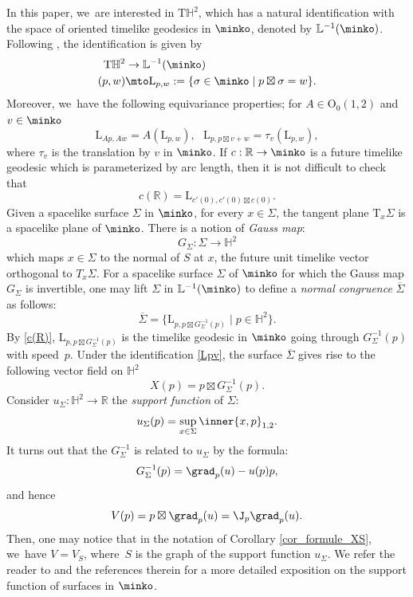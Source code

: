 In this paper, we~are interested in $\mathrm{T}\mathbb{H}^2$, which has a natural identification with the space of oriented timelike geodesics in $\minko$, denoted by $\mathbb{L}^{-1}(\minko)$. Following \cite[\S 6.6]{DGK_complete_lorentz}, the identification is given by
\begin{equation}\label{Lpv}
\begin{aligned}
\mathrm{T}\mathbb{H}^2 & \to \mathbb{L}^{-1}(\minko) \\
(p,w) & \mto \mathrm{L}_{p,w}:=\{\sigma\in\minko \mid p\boxtimes\sigma=w\}.
\end{aligned}
\end{equation}
Moreover, we~have the following equivariance properties; for $A\in \mathrm{O}_0(1,2)$ and $v\in\minko$
\begin{equation}
\mathrm{L}_{Ap,Aw}=A(\mathrm{L}_{p,w}),\ \ \ \mathrm{L}_{p,p\boxtimes v+w}=\tau_v(\mathrm{L}_{p,w}),
\end{equation} where $\tau_v$ is the translation by $v$ in $\minko$.
If $c:\mathbb{R}\to\minko$ is a future timelike geodesic which is parameterized by arc length, then it is not difficult to check that
\begin{equation}\label{c(R)}
c(\mathbb{R})=\mathrm{L}_{c'(0),c'(0)\boxtimes c(0)}.
\end{equation}
Given a spacelike surface $\Sigma$ in $\minko$, \ie for every $x\in\Sigma$, the tangent plane $\mathrm{T}_x\Sigma$ is a spacelike plane of $\minko$. There is a notion of \emph{Gauss map}:
\[
G_{\Sigma}:\Sigma\to\mathbb{H}^2
\]
which maps $x\in\Sigma$ to the normal of $S$ at $x$, \ie the future unit timelike vector orthogonal to $T_x\Sigma$. For a spacelike surface $\Sigma$ of $\minko$ for which the Gauss map $G_{\Sigma}$ is invertible, one may lift $\Sigma$ in $\mathbb{L}^{-1}(\minko)$ to define a \emph{normal congruence} $\overline{\Sigma}$ as follows:
\begin{equation}
\overline{\Sigma}=\{\mathrm{L}_{p,p\boxtimes G^{-1}_{\Sigma}(p)}\mid p\in\mathbb{H}^2\}.
\end{equation}
By \eqref{c(R)}, $\mathrm{L}_{p,p\boxtimes G^{-1}_{\Sigma}(p)}$ is the timelike geodesic in $\minko$ going through $G_{\Sigma}^{-1}(p)$ with speed~$p$.
Under the identification \eqref{Lpv}, the surface $\overline{\Sigma}$ gives rise to the following vector field on $\mathbb{H}^2$
\[
X(p)=p\boxtimes G_{\Sigma}^{-1}(p).
\]
Consider $u_{\Sigma}:\mathbb{H}^2\to\mathbb{R}$ the \emph{support function} of $\Sigma$:
\[
u_{\Sigma}(p)=\sup_{x\in\Sigma}\inner{x,p}_{1,2}.
\]It turns out that the $G_{\Sigma}^{-1}$ is related to $u_{\Sigma}$ by the formula:
\[
G_{\Sigma}^{-1}(p)=\grad_p(u)-u(p)p,
\]
and hence
\[
V(p)=p\boxtimes \grad_p(u)=\J_p\grad_p(u).
\]
Then, one may notice that in the notation of Corollary \ref{cor_formule_XS}, we~have $V=V_S$, where~$S$ is the graph of the support function $u_{\Sigma}$.
We refer the reader to \cite{BS17} and the references therein for a more detailed exposition on the support function of surfaces in $\minko$.

